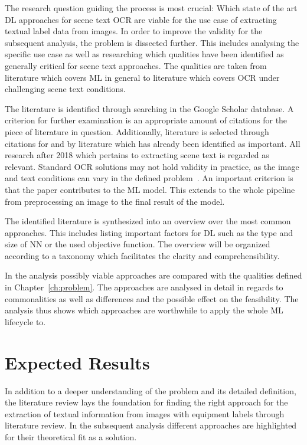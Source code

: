 The research question guiding the process is most crucial: Which state of the art \ac{DL}
approaches for scene text \ac{OCR} are viable for the use case of extracting textual label data from
images.
In order to improve the validity for the subsequent analysis, the problem is dissected further.
This includes analysing the specific use case as well as researching which qualities have been
identified as generally critical for scene text approaches.
The qualities are taken from literature which covers \ac{ML} in general to literature
which covers \ac{OCR} under challenging scene text conditions.

The literature is identified through searching in the Google Scholar database.
A criterion for further examination is an appropriate amount of citations for the piece of literature
in question.
Additionally, literature is selected through citations for and by literature which has already been
identified as important.
All research after 2018 which pertains to extracting scene text is regarded as relevant.
Standard \ac{OCR} solutions may not hold validity in practice, as the image and text conditions can
vary in the defined problem~\citep{chen_text_2021}.
An important criterion is that the paper contributes to the \ac{ML} model.
This extends to the whole pipeline from preprocessing an image to the final result of the model.

The identified literature is synthesized into an overview over the most common approaches.
This includes listing important factors for \ac{DL} such as the type and size of \ac{NN} or the used
objective function.
The overview will be organized according to a taxonomy which facilitates the clarity and
comprehensibility.

In the analysis possibly viable approaches are compared with the qualities defined
in Chapter~\ref{ch:problem}.
The approaches are analysed in detail in regards to commonalities as well as differences and the
possible effect on the feasibility.
The analysis thus shows which approaches are worthwhile to apply the whole \ac{ML} lifecycle to.

\section{Expected Results}
In addition to a deeper understanding of the problem and its detailed definition, the literature
review lays the foundation for finding the right approach for the extraction of textual
information from images with equipment labels through literature review.
In the subsequent analysis different approaches are highlighted for their theoretical fit as a solution.

